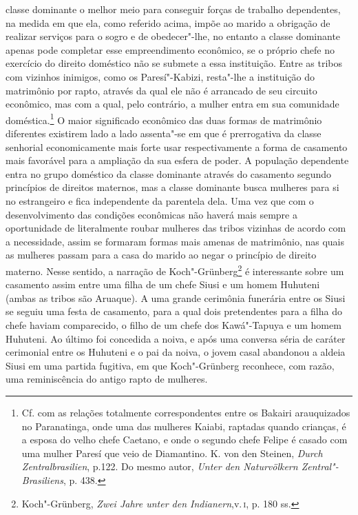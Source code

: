 classe dominante o melhor meio para conseguir forças de trabalho
dependentes, na medida em que ela, como referido acima, impõe ao marido
a obrigação de realizar serviços para o sogro e de obedecer"-lhe, no
entanto a classe dominante apenas pode completar esse empreendimento
econômico, se o próprio chefe no exercício do direito doméstico não se
submete a essa instituição. Entre as tribos com vizinhos inimigos, como
os Paresí"-Kabizi, resta"-lhe a instituição do matrimônio por rapto,
através da qual ele não é arrancado de seu circuito econômico, mas com a
qual, pelo contrário, a mulher entra em sua comunidade
doméstica.\footnote{Cf. com as relações totalmente correspondentes entre
  os Bakairi arauquizados no Paranatinga, onde uma das mulheres Kaiabi,
  raptadas quando crianças, é a esposa do velho chefe Caetano, e onde o
  segundo chefe Felipe é casado com uma mulher Paresí que veio de
  Diamantino. K. von den Steinen, \emph{Durch Zentralbrasilien}, p.122.
  Do mesmo autor, \emph{Unter den Naturvölkern Zentral"-Brasiliens}, p.
  438.} O maior significado econômico das duas formas de matrimônio
diferentes existirem lado a lado assenta"-se em que é prerrogativa da
classe senhorial economicamente mais forte usar respectivamente a forma
de casamento mais favorável para a ampliação da sua esfera de poder. A
população dependente entra no grupo doméstico da classe dominante
através do casamento segundo princípios de direitos maternos, mas a
classe dominante busca mulheres para si no estrangeiro e fica
independente da parentela dela. Uma vez que com o desenvolvimento das
condições econômicas não haverá mais sempre a oportunidade de
literalmente roubar mulheres das tribos vizinhas de acordo com a
necessidade, assim se formaram formas mais amenas de matrimônio, nas
quais as mulheres passam para a casa do marido ao negar o princípio de
direito materno. Nesse sentido, a narração de Koch"-Grünberg\footnote{Koch"-Grünberg,
  \emph{Zwei Jahre unter den Indianern},v.\,\textsc{i}, p. 180 ss.} é interessante
sobre um casamento assim entre uma filha de um chefe Siusi e um homem
Huhuteni (ambas as tribos são Aruaque). A uma grande cerimônia
funerária entre os Siusi se seguiu uma festa de casamento, para a qual
dois pretendentes para a filha do chefe haviam comparecido, o filho de
um chefe dos Kawá"-Tapuya e um homem Huhuteni. Ao último foi concedida a
noiva, e após uma conversa séria de caráter cerimonial entre os Huhuteni
e o pai da noiva, o jovem casal abandonou a aldeia Siusi em uma partida
fugitiva, em que Koch"-Grünberg reconhece, com razão, uma reminiscência
do antigo rapto de mulheres.

